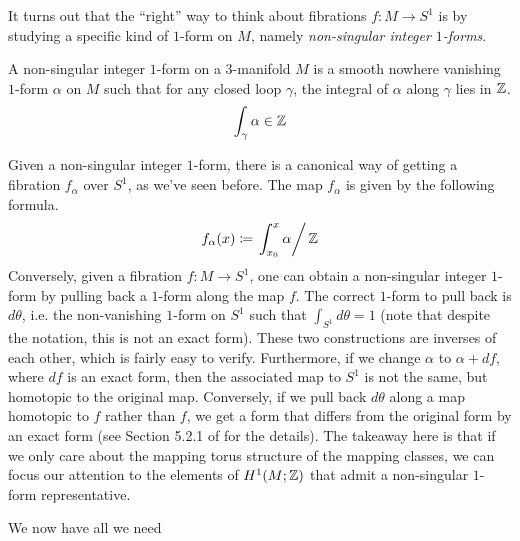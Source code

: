 It turns out that the ``right'' way to think about fibrations $f: M \to S^1$ is by studying a specific kind of
$1$-form on $M$, namely \emph{non-singular integer $1$-forms}.

\begin{defn}
  A non-singular integer $1$-form on a $3$-manifold $M$ is a smooth nowhere vanishing $1$-form $\alpha$ on $M$
  such that for any closed loop $\gamma$, the integral of $\alpha$ along $\gamma$ lies in $\mathbb{Z}$.
  \begin{align*}
    \int_{\gamma} \alpha \in \mathbb{Z}
  \end{align*}
\end{defn}

Given a non-singular integer $1$-form, there is a canonical way of getting a fibration $f_{\alpha}$ over
$S^1$, as we've seen before. The map $f_{\alpha}$ is given by the following formula.
\begin{align*}
  f_{\alpha}(x) \coloneqq \left. \int_{x_0}^x \alpha \right/ \mathbb{Z}
\end{align*}
Conversely, given a fibration $f: M \to S^1$, one can obtain a non-singular integer $1$-form by pulling back a
$1$-form along the map $f$. The correct $1$-form to pull back is $d\theta$, i.e.  the non-vanishing $1$-form
on $S^1$ such that $\int_{S^1} d\theta = 1$ (note that despite the notation, this is not an exact form). These
two constructions are inverses of each other, which is fairly easy to verify. Furthermore, if we change
$\alpha$ to $\alpha + df$, where $df$ is an exact form, then the associated map to $S^1$ is not the same, but
homotopic to the original map. Conversely, if we pull back $d\theta$ along a map homotopic to $f$ rather than
$f$, we get a form that differs from the original form by an exact form (see Section 5.2.1 of
\cite{calegari2007foliations} for the details). The takeaway here is that if we only care about the mapping
torus structure of the mapping classes, we can focus our attention to the elements of $H^1(M; \mathbb{Z})$ that admit
a non-singular $1$-form representative.

We now have all we need
